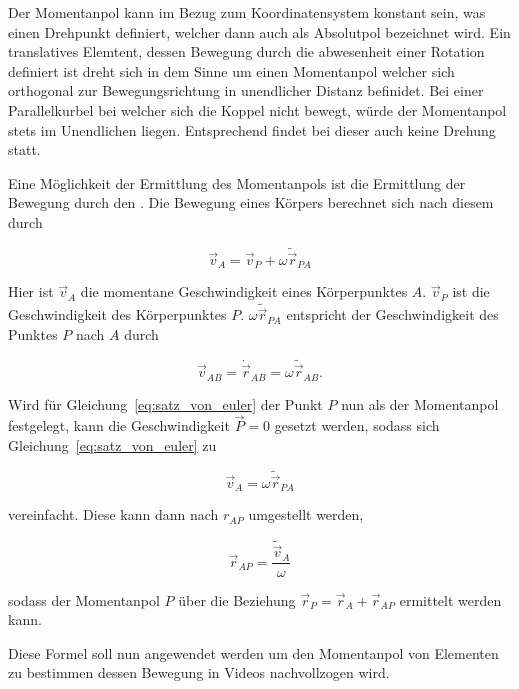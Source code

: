 Der Momentanpol kann im Bezug zum Koordinatensystem konstant sein, was einen Drehpunkt definiert, welcher dann auch als Absolutpol bezeichnet wird.
Ein translatives Elemtent, dessen Bewegung durch die abwesenheit einer Rotation definiert ist dreht sich in dem Sinne um einen Momentanpol welcher sich orthogonal zur Bewegungsrichtung in unendlicher Distanz befinidet.
Bei einer Parallelkurbel bei welcher sich die Koppel nicht bewegt, würde der Momentanpol stets im Unendlichen liegen.
Entsprechend findet bei dieser auch keine Drehung statt.

Eine Möglichkeit der Ermittlung des Momentanpols ist die Ermittlung der Bewegung durch den \cite{Gössner2017}.
Die Bewegung eines Körpers berechnet sich nach diesem durch

\begin{equation}
    \vec{v}_A = \vec{v}_P + \omega \tilde{\vec{r}}_{PA}
    \label{eq:satz_von_euler}
\end{equation} 

Hier ist $\vec{v}_A$ die momentane Geschwindigkeit eines Körperpunktes $A$.
$\vec{v}_P$ ist die Geschwindigkeit des Körperpunktes $P$.
$\omega\tilde{\vec{r}}_{PA}$ entspricht der Geschwindigkeit des Punktes $P$ nach $A$ durch

\begin{equation}
    \vec{v}_{AB} = \dot{\vec{r}}_{AB} = \omega \tilde{\vec{r}}_{AB}.
    \label{eq:absolut_zu_winkel}
\end{equation}

Wird für Gleichung~\ref{eq:satz_von_euler} der Punkt $P$ nun als der Momentanpol festgelegt, kann die Geschwindigkeit $\vec{P} = 0$ gesetzt werden,
sodass sich Gleichung~\ref{eq:satz_von_euler} zu

\begin{equation}
    \vec{v}_A = \omega \tilde{\vec{r}}_{PA}
    \label{eq:satz_von_euler_momentanpol}
\end{equation}

vereinfacht. 
Diese kann dann nach $r_{AP}$ umgestellt werden,

\begin{equation}
    \vec{r}_{AP} = \frac{\tilde{\vec{v}}_A}{\omega}
    \label{eq:euler_rAP}
\end{equation}

sodass der Momentanpol $P$ über die Beziehung $\vec{r}_P = \vec{r}_A + \vec{r}_{AP}$ ermittelt werden kann.

Diese Formel soll nun angewendet werden um den Momentanpol von Elementen zu bestimmen dessen Bewegung in Videos nachvollzogen wird.

